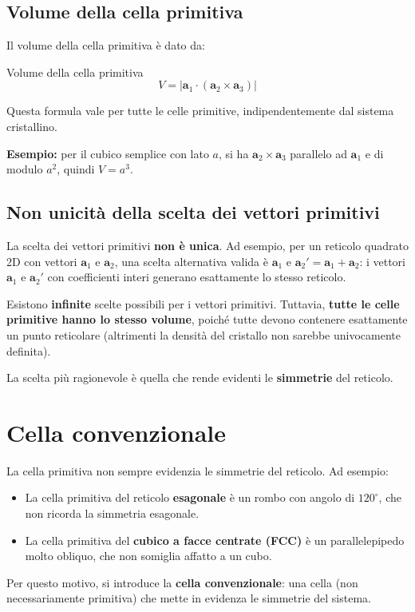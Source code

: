 \subsection*{Volume della cella primitiva}
Il volume della cella primitiva è dato da:
\begin{equazione}{Volume della cella primitiva}
\begin{equation}
V = \left| \mathbf{a}_1 \cdot (\mathbf{a}_2 \times \mathbf{a}_3) \right|
\end{equation}
\end{equazione}
Questa formula vale per tutte le celle primitive, indipendentemente dal sistema cristallino.

\textbf{Esempio:} per il cubico semplice con lato $a$, si ha $\mathbf{a}_2 \times \mathbf{a}_3$ parallelo ad $\mathbf{a}_1$ e di modulo $a^2$, quindi $V = a^3$.

\subsection*{Non unicità della scelta dei vettori primitivi}
La scelta dei vettori primitivi \textbf{non è unica}. Ad esempio, per un reticolo quadrato 2D con vettori $\mathbf{a}_1$ e $\mathbf{a}_2$, una scelta alternativa valida è $\mathbf{a}_1$ e $\mathbf{a}_2' = \mathbf{a}_1 + \mathbf{a}_2$: i vettori $\mathbf{a}_1$ e $\mathbf{a}_2'$ con coefficienti interi generano esattamente lo stesso reticolo.

Esistono \textbf{infinite} scelte possibili per i vettori primitivi. Tuttavia, \textbf{tutte le celle primitive hanno lo stesso volume}, poiché tutte devono contenere esattamente un punto reticolare (altrimenti la densità del cristallo non sarebbe univocamente definita).

La scelta più ragionevole è quella che rende evidenti le \textbf{simmetrie} del reticolo.

\section{Cella convenzionale}

La cella primitiva non sempre evidenzia le simmetrie del reticolo. Ad esempio:
\begin{itemize}
    \item La cella primitiva del reticolo \textbf{esagonale} è un rombo con angolo di $120^\circ$, che non ricorda la simmetria esagonale.
    \item La cella primitiva del \textbf{cubico a facce centrate (FCC)} è un parallelepipedo molto obliquo, che non somiglia affatto a un cubo.
\end{itemize}
Per questo motivo, si introduce la \textbf{cella convenzionale}: una cella (non necessariamente primitiva) che mette in evidenza le simmetrie del sistema.

